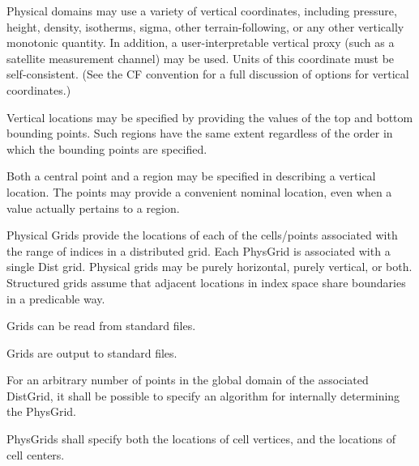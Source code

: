 

Physical domains may use a variety of vertical coordinates, including pressure,
height, density, isotherms, sigma, other terrain-following, or any other
vertically monotonic quantity.  In addition, a user-interpretable vertical
proxy (such as a satellite measurement channel) may be used.  Units of this
coordinate must be self-consistent.  (See the CF convention for a full
discussion of options for vertical coordinates.)



Vertical locations may be specified by providing the values of the top and
bottom bounding points.  Such regions have the same extent regardless of the
order in which the bounding points are specified.


  Both a central point and a region may be specified in describing a vertical
location.  The points may provide a convenient nominal location, even when
a value actually pertains to a region.


Physical Grids provide the locations of each of the cells/points associated with
the range of indices in a distributed grid.  Each PhysGrid is associated with a
single Dist grid.  Physical grids may be purely horizontal, purely vertical, or
both.  Structured grids assume that adjacent locations in index space share
boundaries in a predicable way.


Grids can be read from standard files.


Grids are output to standard files.


For an arbitrary number of points in the global domain of the associated
DistGrid, it shall be possible to specify an algorithm for internally
determining the PhysGrid.


PhysGrids shall specify both the locations of cell vertices, and the locations
of cell centers.

